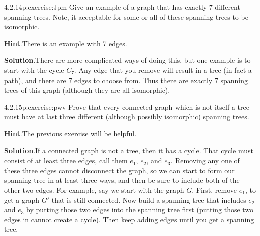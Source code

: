 \documentclass[twoside,11pt,]{book}
\newcommand{\blocktitlefont}{\relax}
\numberwithin{equation}{chapter}
\begin{document}
\begin{divisionsolution}{4.2.14}{}{p:exercise:Jpm}%
Give an example of a graph that has exactly 7 different spanning trees. Note, it acceptable for some or all of these spanning trees to be isomorphic.%
\par\smallskip%
\noindent\textbf{\blocktitlefont Hint}.\quad{}There is an example with 7 edges.%
\par\smallskip%
\noindent\textbf{\blocktitlefont Solution}.\quad{}There are more complicated ways of doing this, but one example is to start with the cycle \(C_7\). Any edge that you remove will result in a tree (in fact a path), and there are 7 edges to choose from. Thus there are exactly 7 spanning trees of this graph (although they are all isomorphic).%
\end{divisionsolution}%
\begin{divisionsolution}{4.2.15}{}{p:exercise:pwv}%
Prove that every connected graph which is not itself a tree must have at last three different (although possibly isomorphic) spanning trees.%
\par\smallskip%
\noindent\textbf{\blocktitlefont Hint}.\quad{}The previous exercise will be helpful.%
\par\smallskip%
\noindent\textbf{\blocktitlefont Solution}.\quad{}If a connected graph is not a tree, then it has a cycle. That cycle must consist of at least three edges, call them \(e_1\), \(e_2\), and \(e_3\). Removing any one of these three edges cannot disconnect the graph, so we can start to form our spanning tree in at least three ways, and then be sure to include both of the other two edges. For example, say we start with the graph \(G\). First, remove \(e_1\), to get a graph \(G'\) that is still connected. Now build a spanning tree that includes \(e_2\) and \(e_3\) by putting those two edges into the spanning tree first (putting those two edges in cannot create a cycle). Then keep adding edges until you get a spanning tree.%
\end{divisionsolution}%
\end{document}
